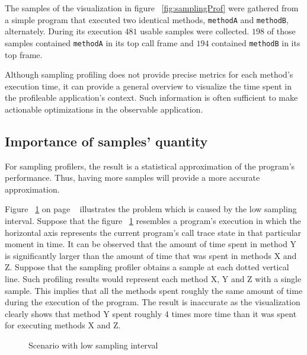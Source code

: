 \documentclass[..thesis.tex]{subfiles}
\begin{document}
The samples of the visualization in figure ~\ref{fig:samplingProf} were gathered from a simple program that executed two identical methods, \texttt{methodA} and \texttt{methodB}, alternately. During its execution $481$ usable samples were collected. $198$ of those samples contained \texttt{methodA} in its top call frame and $194$ contained \texttt{methodB} in its top frame.

Although sampling profiling does not provide precise metrics for each method's execution time, it can provide a general overview to visualize the time spent in the profileable application's context. Such information is often sufficient to make actionable optimizations in the observable application.

\subsection{Importance of samples' quantity}

For sampling profilers, the result is a statistical approximation of the program's performance. Thus, having more samples will provide a more accurate approximation. 

Figure ~\ref{fig:lowSampleCount} on page ~\pageref{fig:lowSampleCount} illustrates the problem which is caused by the low sampling interval. Suppose that the figure ~\ref{fig:lowSampleCount} resembles a program's execution in which the horizontal axis represents the current program's call trace state in that particular moment in time. It can be observed that the amount of time spent in method Y is significantly larger than the amount of time that was spent in methods X and Z. Suppose that the sampling profiler obtains a sample at each dotted vertical line. Such profiling results would represent each method X, Y and Z with a single sample. This implies that all the methods spent roughly the same amount of time during the execution of the program. The result is inaccurate as the visualization clearly shows that method Y spent roughly 4 times more time than it was spent for executing methods X and Z.

\begin{figure}[H]
\centering
{}
\caption{Scenario with low sampling interval}
\label{fig:lowSampleCount}
\end{figure}
\end{document}
